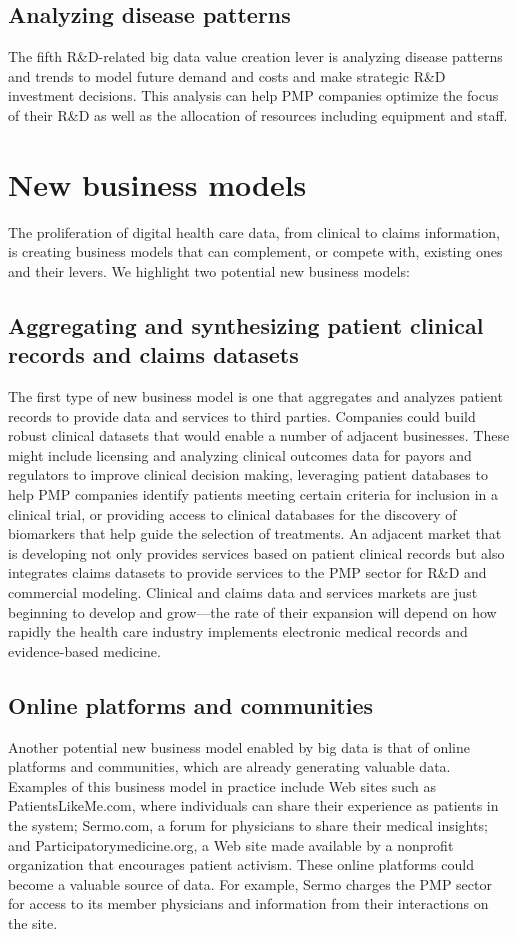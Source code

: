 \documentclass[twocolumn]{article}
\begin{document}
\subsection{Analyzing disease patterns}
The fifth R\&D-related big data value creation lever is analyzing disease patterns and trends to model future demand and costs and make strategic R\&D investment decisions. This analysis can help PMP companies optimize the focus of their R\&D as well as the allocation of resources including equipment and staff.

\section{New business models}
The proliferation of digital health care data, from clinical to claims information, is creating business models that can complement, or compete with, existing ones and their levers. We highlight two potential new business models:

\subsection{Aggregating and synthesizing patient clinical records and claims datasets}
The first type of new business model is one that aggregates and analyzes patient records to provide data and services to third parties. Companies could build robust clinical datasets that would enable a number of adjacent businesses. These might include licensing and analyzing clinical outcomes data for payors and regulators to improve clinical decision making, leveraging patient databases to help PMP companies identify patients meeting certain criteria for inclusion
in a clinical trial, or providing access to clinical databases for the discovery of biomarkers that help guide the selection of treatments. An adjacent market that is developing not only provides services based on patient clinical records but also integrates claims datasets to provide services to the PMP sector for R\&D and commercial modeling. Clinical and claims data and services markets are just beginning to develop and grow—the rate of their expansion will depend on how rapidly the health care industry implements electronic medical records and evidence-based medicine.

\subsection{Online platforms and communities}
Another potential new business model enabled by big data is that of online platforms and communities, which are already generating valuable data. Examples of this business model in practice include Web sites such as PatientsLikeMe.com, where individuals can share their experience
as patients in the system; Sermo.com, a forum for physicians to share their medical insights; and Participatorymedicine.org, a Web site made available by a nonprofit organization that encourages patient activism. These online platforms could become a valuable source of data. For example, Sermo charges the PMP sector for access to its member physicians and information from their interactions on the site.
\end{document}
